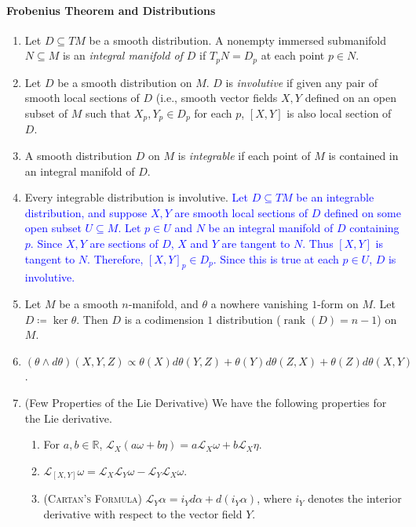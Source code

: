 \documentclass{article}
\newcommand{\expl}[1]{\textcolor{blue}{#1}}
\begin{document}
	\paragraph{Frobenius Theorem and Distributions}
	\begin{enumerate}[start = 29]
		\item Let $D \subseteq TM$ be a smooth distribution. A nonempty immersed submanifold $N\subseteq M$ is an \textit{integral manifold of $D$} if $T_{p}N = D_{p}$ at each point $p \in N$. 
		\item Let $D$ be a smooth distribution on $M$. $D$ is \textit{involutive} if given any pair of smooth local sections of $D$ (i.e., smooth vector fields $X, Y$ defined on an open subset of $M$ such that $X_p, Y_p \in D_p$ for each $p$, $[X,Y]$ is also local section of $D$. 
		\item A smooth distribution $D$ on $M$ is \textit{integrable} if each point of $M$ is contained in an integral manifold of $D$. 
		\item Every integrable distribution is involutive. \newline \expl{Let $D \subseteq TM$ be an integrable distribution, and suppose $X, Y$ are smooth local sections of $D$ defined on some open subset $U \subseteq M$. Let $p \in U$ and $N$ be an integral manifold of $D$ containing $p$. Since $X, Y$ are sections of $D$, $X$ and $Y$ are tangent to $N$. Thus $[X, Y]$ is tangent to $N$. Therefore, $[X, Y]_{p} \in D_{p}$. Since this is true at each $p \in U$, $D$ is involutive.}
		\item Let $M$ be a smooth $n$-manifold, and $\theta$ a nowhere vanishing $1$-form on $M$. Let $D \coloneqq \ker{\theta}$. Then $D$ is a codimension $1$ distribution ($\operatorname{rank}(D) = n - 1$) on $M$. 
		\item $(\theta \wedge d\theta)(X,Y,Z) \propto \theta(X)d\theta(Y,Z) + \theta(Y)d\theta(Z, X) + \theta(Z)d\theta(X, Y)$. 
		\item (Few Properties of the Lie Derivative) We have the following properties for the Lie derivative. \vspace{-0.25cm}
		\begin{enumerate}[itemsep =-2pt,label = (\arabic{*})]
			\item For $a, b \in \mathbb{R}$, $\mathscr{L}_{X}(a\omega + b \eta) = a\mathscr{L}_{X}\omega + b\mathscr{L}_{X}\eta$. 
			\item $\mathscr{L}_{[X, Y]}\omega = \mathscr{L}_{X}\mathscr{L}_{Y}\omega - \mathscr{L}_{Y}\mathscr{L}_{X}\omega$. 
			\item (\textsc{Cartan's Formula}) $\mathscr{L}_{Y}\alpha = i_{Y}d\alpha + d(i_{Y}\alpha)$, where $i_{Y}$ denotes the interior derivative with respect to the vector field $Y$.

\end{enumerate}
\end{enumerate}
\end{document}
